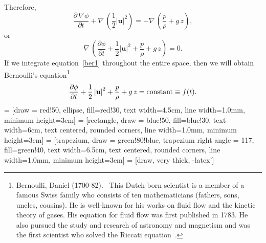 \documentclass[12pt,a4paper]{report}
\begin{document}
Therefore,
\begin{equation}
\frac{\partial \, \nabla \phi}{\partial t} + \nabla \, \left(\frac{1}{2} \left|\mathbf{u} \right|^2 \right) = -\nabla \, \left(\frac{p}{\rho} + g\,z \right),
\end{equation}
or
\begin{equation}
\nabla \, \left(\frac{\partial \phi}{\partial t} + \frac{1}{2} \left|\mathbf{u} \right|^2 + \frac{p}{\rho} + g\,z \right) = 0.  \label{ber1}
\end{equation}
If we integrate equation~\eqref{ber1} throughout the entire space, then we will obtain Bernoulli's equation\footnote[7]{Bernoulli, Daniel (1700-82). \ This Dutch-born scientist is a member of a famous Swiss family who consists of ten mathematicians (fathers, sons, uncles, cousins). He is well-known for his works on fluid flow and the kinetic theory of gases. His equation for fluid flow was first published in 1783. He also pursued the study and research of astronomy and magnetism and was the first scientist who solved the Riccati equation~\cite{jrs}.} 
\begin{equation}
\frac{\partial \phi}{\partial t} + \frac{1}{2} \left|\mathbf{u} \right|^2 + \frac{p}{\rho} + g\,z = \textmd{constant} \equiv f(t).  \label{ber2}
\end{equation}
\newpage
 = [draw = red!50, ellipse, fill=red!30, text width=4.5cm, line width=1.0mm, minimum height=3em]
 = [rectangle, draw = blue!50, fill=blue!30, text width=6cm, text centered, rounded corners, line width=1.0mm, minimum height=3em]
 = [trapezium, draw = green!80!blue, trapezium right angle = 117, fill=green!40, text width=6.5cm, text centered, rounded corners, line width=1.0mm, minimum height=3em]
 = [draw, very thick, -latex']
\end{document}
